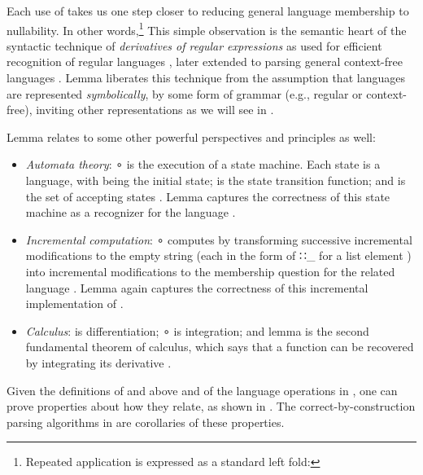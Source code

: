 \documentclass[acmsmall,screen,anonymous,timestamp]{acmart}
\begin{document}
Each use of  takes us one step closer to reducing general language membership to nullability.
In other words,\footnote{Repeated application is expressed as a standard left fold:
}%
This simple observation is the semantic heart of the syntactic technique of \emph{derivatives of regular expressions} as used for efficient recognition of regular languages \citep{Brzozowski64}, later extended to parsing general context-free languages \citep{Might2010YaccID}.
Lemma  liberates this technique from the assumption that languages are represented \emph{symbolically}, by some form of grammar (e.g., regular or context-free), inviting other representations as we will see in .

Lemma  relates to some other powerful perspectives and principles as well:
\begin{itemize}

\item 
\emph{Automata theory}: { \AF ∘   } is the execution of a state machine.
Each state is a language, with  being the initial state;  is the state transition function; and  is the set of accepting states \needcite{}.
Lemma  captures the correctness of this state machine as a recognizer for the language .

\item
\emph{Incremental computation}: { \AF ∘   } computes  by transforming successive incremental modifications to the empty string (each in the form of { \AIC ∷\_} for a list element ) into incremental modifications to the membership question for the related language {  } \needcite{}.
Lemma  again captures the correctness of this incremental implementation of .

\item 
\emph{Calculus}:  is differentiation; { \AF ∘   } is integration; and lemma  is the second fundamental theorem of calculus, which says that a function can be recovered by integrating its derivative \needcite{}.

\end{itemize}

Given the definitions of  and  above and of the language operations in , one can prove properties about how they relate, as shown in
.
The correct-by-construction parsing algorithms in  are corollaries of these properties.
\end{document}
